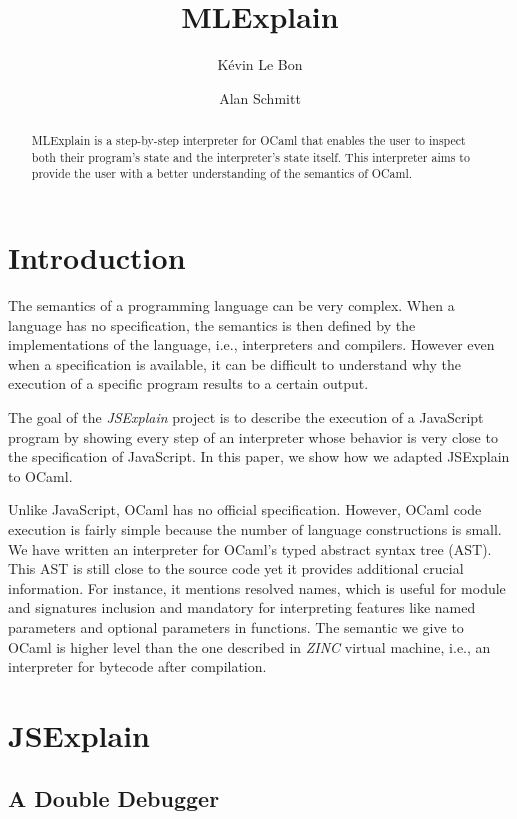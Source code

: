 \documentclass[twocolumn]{article}
\author{ K\'evin Le Bon \and Alan Schmitt }
\title{MLExplain}
\begin{document}
\maketitle

\begin{abstract}
  MLExplain is a step-by-step interpreter for OCaml that enables the
  user to inspect both their program's state and the interpreter's state
  itself. This interpreter aims to provide the user with a better understanding
  of the semantics of OCaml.
\end{abstract}

\section{Introduction}

The semantics of a programming language can be very complex. When a language
has no specification, the semantics is then defined by the implementations of
the language, i.e., interpreters and compilers. However even when a
specification is available, it can be difficult to understand why the execution
of a specific program results to a certain output.

The goal of the \emph{JSExplain} project \cite{chargueraud:hal-01745792} is to
describe the execution of a JavaScript program by showing every step of an
interpreter whose behavior is very close to the specification of JavaScript. In
this paper, we show how we adapted JSExplain to OCaml.

Unlike JavaScript, OCaml has no official specification. However, OCaml code
execution is fairly simple because the number of language constructions is
small. We have written an interpreter for OCaml's typed abstract syntax tree
(AST). This AST is still close to the source code yet it provides additional
crucial information. For instance, it mentions resolved names, which is useful
for module and signatures inclusion and mandatory for interpreting features like
named parameters and optional parameters in functions. The semantic we give to
OCaml is higher level than the one described in \emph{ZINC} \cite{Leroy-ZINC}
virtual machine, i.e., an interpreter for bytecode after compilation.

\section{JSExplain}

\subsection{A Double Debugger}
\label{subsec:double-debugger}
\end{document}
